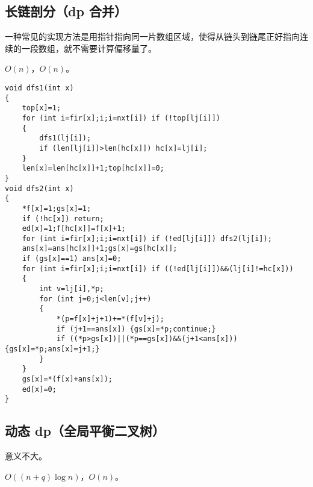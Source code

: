 \documentclass[12pt]{ctexart}
\begin{document}
\subsection{长链剖分（dp 合并）}

一种常见的实现方法是用指针指向同一片数组区域，使得从链头到链尾正好指向连续的一段数组，就不需要计算偏移量了。

$O(n)$，$O(n)$。

\begin{lstlisting}
void dfs1(int x)
{
	top[x]=1;
	for (int i=fir[x];i;i=nxt[i]) if (!top[lj[i]])
	{
		dfs1(lj[i]);
		if (len[lj[i]]>len[hc[x]]) hc[x]=lj[i];
	}
	len[x]=len[hc[x]]+1;top[hc[x]]=0;
}
void dfs2(int x)
{
	*f[x]=1;gs[x]=1;
	if (!hc[x]) return;
	ed[x]=1;f[hc[x]]=f[x]+1;
	for (int i=fir[x];i;i=nxt[i]) if (!ed[lj[i]]) dfs2(lj[i]);
	ans[x]=ans[hc[x]]+1;gs[x]=gs[hc[x]];
	if (gs[x]==1) ans[x]=0;
	for (int i=fir[x];i;i=nxt[i]) if ((!ed[lj[i]])&&(lj[i]!=hc[x]))
	{
		int v=lj[i],*p;
		for (int j=0;j<len[v];j++)
		{
			*(p=f[x]+j+1)+=*(f[v]+j);
			if (j+1==ans[x]) {gs[x]=*p;continue;}
			if ((*p>gs[x])||(*p==gs[x])&&(j+1<ans[x])) {gs[x]=*p;ans[x]=j+1;}
		}
	}
	gs[x]=*(f[x]+ans[x]);
	ed[x]=0;
}
\end{lstlisting}

\subsection{动态 dp（全局平衡二叉树）}

意义不大。

$O((n+q)\log n)$，$O(n)$。
\end{document}
